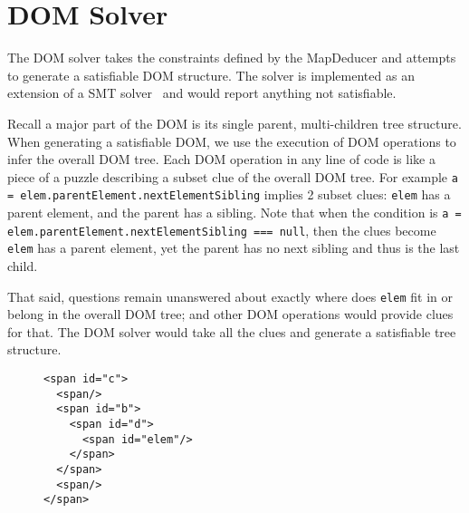 \section{DOM Solver}
The DOM solver takes the constraints defined by the MapDeducer and attempts to generate a satisfiable DOM structure.  The solver is implemented as an extension of a SMT solver~\cite{cvc3} and would report anything not satisfiable.  

Recall a major part of the DOM is its single parent, multi-children tree structure.  When generating a satisfiable DOM, we use the execution of DOM operations to infer the overall DOM tree.    
Each DOM operation in any line of code is like a piece of a puzzle describing a subset clue of the overall DOM tree.   
For example {\tt a = elem.parentElement.nextElementSibling} implies 2 subset clues: {\tt elem} has a parent element, and the parent has a sibling.  
Note that when the condition is {\tt a = elem.parentElement.nextElementSibling === null}, then the clues become {\tt elem} has a parent element, yet the parent has no next sibling and thus is the last child.

That said, questions remain unanswered about exactly where does {\tt elem} fit in or belong in the overall DOM tree; and other DOM operations would provide clues for that.  
The DOM solver would take all the clues and generate a satisfiable tree structure.   

\begin{figure}
\begin{lstlisting}[caption=HTML generated for guiding the execution to follow the {\tt true} branch in the {\tt if} statement in Sample Code\ref{dom0}.label=htmlExtended]  
<span id="c">
  <span/>
  <span id="b">
    <span id="d">
      <span id="elem"/>
    </span>
  </span>
  <span/>
</span>
\end{lstlisting}
\end{figure}



